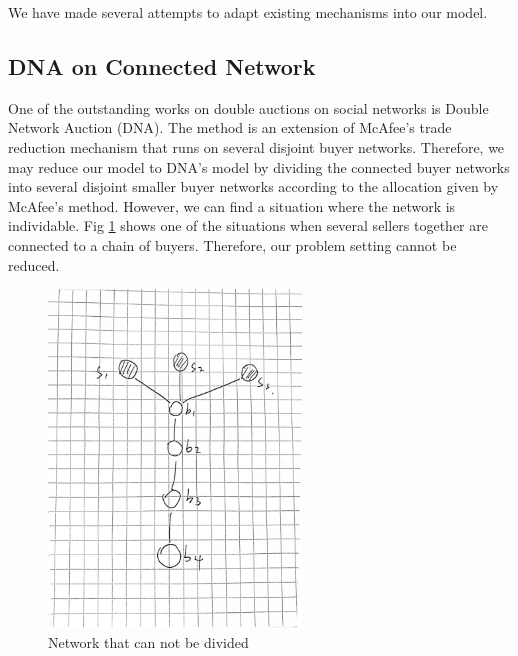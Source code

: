 We have made several attempts to adapt existing mechanisms into our model.
\subsection{DNA on Connected Network}
One of the outstanding works on double auctions on social networks is Double Network Auction (DNA)\cite{DNA}. The method is an extension of McAfee's trade reduction mechanism
that runs on several disjoint buyer networks. Therefore, we may reduce our model to DNA's model
by dividing the connected buyer networks into several disjoint smaller buyer networks according to the allocation
given by McAfee's method.
However, we can find a situation where the network is individable. Fig \ref*{fig:DNACounter}
shows one of the situations when several sellers together are connected to a chain of buyers. Therefore,
our problem setting cannot be reduced.
\begin{figure}[htbp]
  \includegraphics[width=0.6\textwidth]{./figure/DNA_counter_1.jpg}
  \caption{Network that can not be divided}
  \label{fig:DNACounter}
\end{figure}

